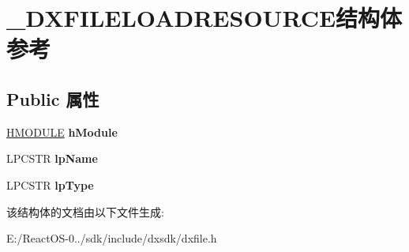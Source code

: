 \hypertarget{struct___d_x_f_i_l_e_l_o_a_d_r_e_s_o_u_r_c_e}{}\section{\+\_\+\+D\+X\+F\+I\+L\+E\+L\+O\+A\+D\+R\+E\+S\+O\+U\+R\+C\+E结构体 参考}
\label{struct___d_x_f_i_l_e_l_o_a_d_r_e_s_o_u_r_c_e}
\subsection*{Public 属性}
\begin{DoxyCompactItemize}
\item 
\mbox{\label{struct___d_x_f_i_l_e_l_o_a_d_r_e_s_o_u_r_c_e_aed4736663ce2b3bbfb3b9c875da00a80}} 
\hyperlink{interfacevoid}{H\+M\+O\+D\+U\+LE} {\bfseries h\+Module}
\item 
\mbox{\label{struct___d_x_f_i_l_e_l_o_a_d_r_e_s_o_u_r_c_e_a268df7abece0f6954eff8fe686a95bf4}} 
L\+P\+C\+S\+TR {\bfseries lp\+Name}
\item 
\mbox{\label{struct___d_x_f_i_l_e_l_o_a_d_r_e_s_o_u_r_c_e_a36eb0a65412afd7b60466426d5a4e308}} 
L\+P\+C\+S\+TR {\bfseries lp\+Type}
\end{DoxyCompactItemize}


该结构体的文档由以下文件生成\+:\begin{DoxyCompactItemize}
\item 
E\+:/\+React\+O\+S-\/0../sdk/include/dxsdk/dxfile.\+h\end{DoxyCompactItemize}
